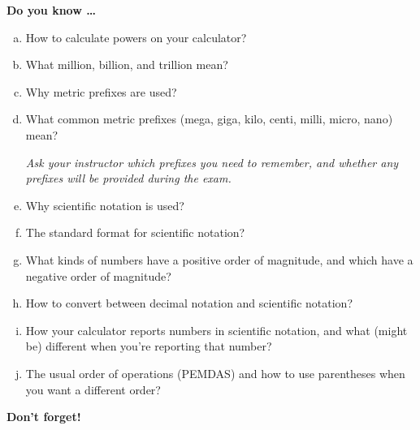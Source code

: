 \newpage




\noindent \textbf{Do you know \ldots} %

\begin{enumerate} [(a)]
\item How to calculate powers on your calculator?
\item What  million, billion, and trillion mean?  
\item Why metric prefixes are used?  
\item What common metric prefixes (mega, giga, kilo, centi, milli, micro, nano) mean? 

\emph{Ask your instructor which prefixes you need to remember, and whether any prefixes will be provided during the exam.} 
\item Why scientific notation is used?  
\item The standard format for scientific notation?  
\item What kinds of numbers have a positive order of magnitude, and which have a negative order of magnitude?
\item How to convert between decimal notation and scientific notation?  
\item How your calculator reports numbers in scientific notation, and what (might be) different when you're reporting that number?  
\item The usual order of operations (PEMDAS) and how to use parentheses when you want a different order?
\end{enumerate}

\bigskip

\noindent \textbf{Don't forget!}
